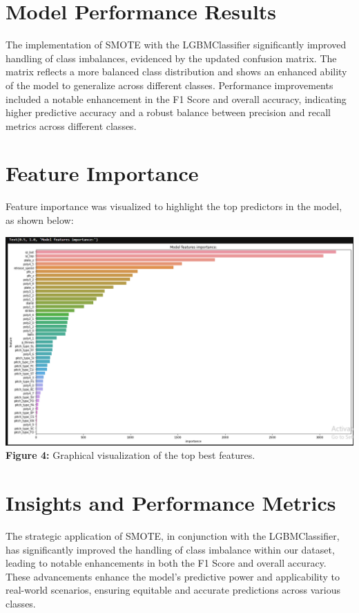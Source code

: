 \documentclass[12pt]{article}
\begin{document}
\section*{Model Performance Results}
The implementation of SMOTE with the LGBMClassifier significantly improved handling of class imbalances, evidenced by the updated confusion matrix. The matrix reflects a more balanced class distribution and shows an enhanced ability of the model to generalize across different classes. Performance improvements included a notable enhancement in the F1 Score and overall accuracy, indicating higher predictive accuracy and a robust balance between precision and recall metrics across different classes.

\section*{Feature Importance}
Feature importance was visualized to highlight the top predictors in the model, as shown below:

\begin{center}
    \includegraphics[width=\textwidth]{feature_importance.png} %
    \textbf{\\Figure 4:} Graphical visualization of the top best features.
\end{center}

\section*{Insights and Performance Metrics}
The strategic application of SMOTE, in conjunction with the LGBMClassifier, has significantly improved the handling of class imbalance within our dataset, leading to notable enhancements in both the F1 Score and overall accuracy. These advancements enhance the model's predictive power and applicability to real-world scenarios, ensuring equitable and accurate predictions across various classes.
\end{document}
